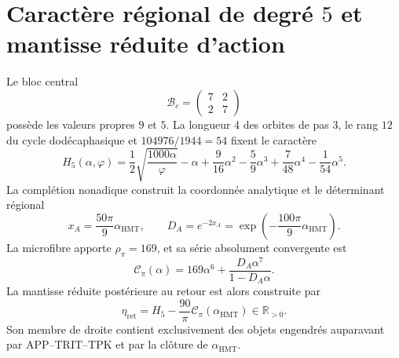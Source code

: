 \section{Caractère régional de degré \texorpdfstring{\(5\)}{5} et mantisse réduite d'action}
\label{sec:l9s102:eta-ret}

Le bloc central
\begin{equation}
 \mathcal B_c=\begin{pmatrix}7&2\\2&7\end{pmatrix}
 \label{eq:l9s102:bc-accion}
\end{equation}
possède les valeurs propres \(9\) et \(5\). La longueur \(4\) des orbites de pas
\(3\), le rang \(12\) du cycle dodécaphasique et
\(104976/1944=54\) fixent le caractère
\begin{equation}
 \boxed{
 H_5(\alpha,\varphi)
 =\frac12\sqrt{\frac{1000\alpha}{\varphi}}-\alpha
 +\frac9{16}\alpha^2-\frac59\alpha^3
 +\frac7{48}\alpha^4-\frac1{54}\alpha^5.}
 \label{eq:l9s102:h5}
\end{equation}
La complétion nonadique construit la coordonnée analytique et le déterminant
régional
\begin{equation}
 x_A=\frac{50\pi}{9}\alpha_{\mathrm{HMT}},
 \qquad
 D_A=e^{-2x_A}
 =\exp\!\left(-\frac{100\pi}{9}\alpha_{\mathrm{HMT}}\right).
 \label{eq:l9s102:xa-da}
\end{equation}
La microfibre apporte \(\rho_\pi=169\), et sa série absolument
convergente est
\begin{equation}
 \mathscr C_\pi(\alpha)
 =169\alpha^6+\frac{D_A\alpha^7}{1-D_A\alpha}.
 \label{eq:l9s102:cpi}
\end{equation}
La mantisse réduite postérieure au retour est alors construite par
\begin{equation}
 \boxed{
 \eta_{\mathrm{ret}}
 =H_5-\frac{90}{\pi}\mathscr C_\pi(\alpha_{\mathrm{HMT}})
 \in\mathbb R_{>0}.}
 \label{eq:l9s102:eta-ret}
\end{equation}
Son membre de droite contient exclusivement des objets engendrés auparavant
par APP--TRIT--TPK et par la clôture de \(\alpha_{\mathrm{HMT}}\).

